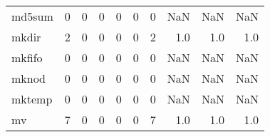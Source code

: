 \begin{longtable}{lrrrrrrrrr}
md5sum    &                                                  0 &                                                  0 &                                                  0 &                                                  0 &                                                  0 &                                                  0 &                                                NaN &                                    NaN &                                  NaN \\
mkdir     &                                                  2 &                                                  0 &                                                  0 &                                                  0 &                                                  0 &                                                  2 &                                                1.0 &                                    1.0 &                                  1.0 \\
mkfifo    &                                                  0 &                                                  0 &                                                  0 &                                                  0 &                                                  0 &                                                  0 &                                                NaN &                                    NaN &                                  NaN \\
mknod     &                                                  0 &                                                  0 &                                                  0 &                                                  0 &                                                  0 &                                                  0 &                                                NaN &                                    NaN &                                  NaN \\
mktemp    &                                                  0 &                                                  0 &                                                  0 &                                                  0 &                                                  0 &                                                  0 &                                                NaN &                                    NaN &                                  NaN \\
mv        &                                                  7 &                                                  0 &                                                  0 &                                                  0 &                                                  0 &                                                  7 &                                                1.0 &                                    1.0 &                                  1.0 \\

\end{longtable}
